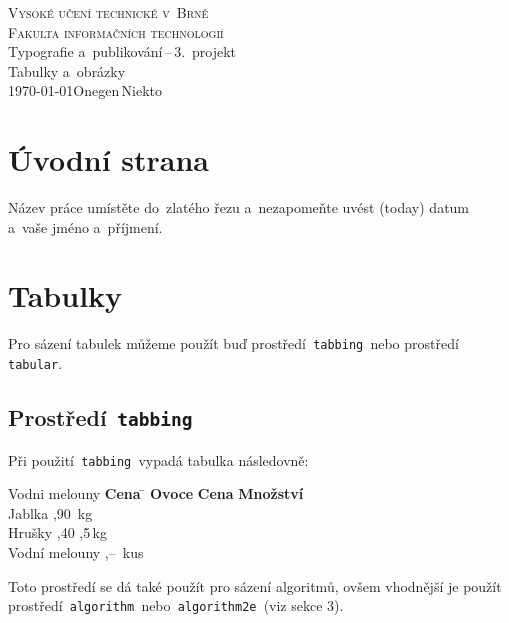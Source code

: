 \documentclass[a4paper, 11pt]{article}
\begin{document}
\begin{titlepage}
	\begin{center}
		{\Huge \textsc{Vysoké učení technické v~Brně}\\}
		{\huge \textsc{Fakulta informačních technologií}\\}
		{\LARGE Typografie a~publikování\,--\,3.\ projekt\\}
		{\Huge Tabulky a~obrázky\\}
		{\Large \today \hfill Onegen\,Niekto}
	\end{center}
\end{titlepage}

\section{Úvodní strana}

Název práce umístěte do~zlatého řezu a~nezapomeňte uvést  (today)
datum a~vaše jméno a~příjmení.

\section{Tabulky}

Pro sázení tabulek můžeme použít buď prostředí\texttt{ tabbing }nebo
prostředí\texttt{ tabular}.

\subsection{Prostředí\texttt{ tabbing}}

Při použití\texttt{ tabbing }vypadá tabulka následovně:
%
\begin{tabbing}
	Vodni melouny \quad  \= \textbf{Cena} \quad \=                \kill
	\textbf{Ovoce}       \> \textbf{Cena}       \> \textbf{Množství} \\
	Jablka               ,90               \,kg             \\
	Hrušky               ,40               ,5\,kg           \\
	Vodní melouny        ,--               \,kus            \\
\end{tabbing}

\noindent
Toto prostředí se dá také použít pro sázení algoritmů, ovšem vhodnější je
použít prostředí\texttt{ algorithm }nebo\texttt{ algorithm2e }(viz sekce
3).
\end{document}
